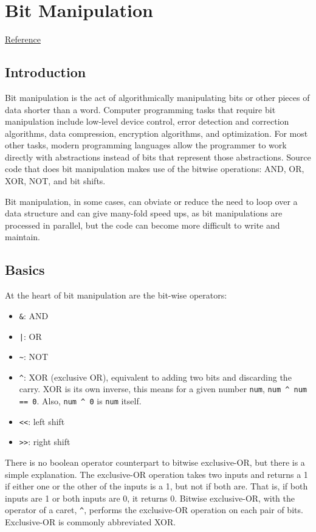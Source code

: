 \documentclass[12pt]{article}
\date{\today}
\title{}
\begin{document}
\tableofcontents

\section{Bit Manipulation}
\label{sec:org5eab500}
\href{https://leetcode.com/problems/sum-of-two-integers/discuss/84278/A-summary:-how-to-use-bit-manipulation-to-solve-problems-easily-and-efficiently}{Reference}
\subsection{Introduction}
\label{sec:orgdddf8e5}
Bit manipulation is the act of algorithmically manipulating bits or other pieces of data shorter than a word. Computer programming tasks that require bit manipulation include low-level device control, error detection and correction algorithms, data compression, encryption algorithms, and optimization. For most other tasks, modern programming languages allow the programmer to work directly with abstractions instead of bits that represent those abstractions. Source code that does bit manipulation makes use of the bitwise operations: AND, OR, XOR, NOT, and bit shifts.

Bit manipulation, in some cases, can obviate or reduce the need to loop over a data structure and can give many-fold speed ups, as bit manipulations are processed in parallel, but the code can become more difficult to write and maintain.
\subsection{Basics}
\label{sec:org31494ac}
At the heart of bit manipulation are the bit-wise operators:
\begin{itemize}
\item \texttt{\&}: AND
\item \texttt{|}: OR
\item \texttt{\textasciitilde{}}: NOT
\item \texttt{\textasciicircum{}}: XOR (exclusive OR), equivalent to adding two bits and discarding the carry. XOR is its own inverse, this means for a given number \texttt{num}, \texttt{num \textasciicircum{} num == 0}. Also, \texttt{num \textasciicircum{} 0} is \texttt{num} itself.
\item \texttt{<<}: left shift
\item \texttt{>>}: right shift
\end{itemize}

There is no boolean operator counterpart to bitwise exclusive-OR, but there is a simple explanation. The exclusive-OR operation takes two inputs and returns a 1 if either one or the other of the inputs is a 1, but not if both are. That is, if both inputs are 1 or both inputs are 0, it returns 0. Bitwise exclusive-OR, with the operator of a caret, \texttt{\textasciicircum{}}, performs the exclusive-OR operation on each pair of bits. Exclusive-OR is commonly abbreviated XOR.
\end{document}
